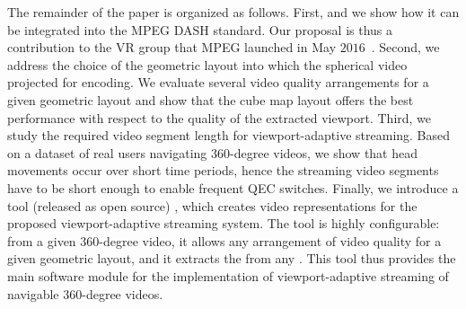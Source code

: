The remainder of the paper is organized as follows. First,  and
we show how it can be integrated into
the \ac{MPEG} \ac{DASH} standard. Our proposal is thus a contribution
to the \ac{VR} group that \ac{MPEG} launched in May
$2016$~\cite{mpeg-vr}. Second, we address the choice of the geometric
layout into which the spherical video  projected for
encoding. We evaluate several video quality arrangements for a given
geometric layout and show that the cube map layout offers the best
performance with respect to the quality of the extracted viewport.
Third, we study the required video segment length for
viewport-adaptive streaming. Based on a dataset of real users
navigating 360-degree videos, we show that head movements occur over
short time periods, hence the streaming video segments have to be
short enough to enable frequent \ac{QEC} switches. 
Finally, we introduce a tool (released as open source)%
, which creates video representations for the proposed viewport-adaptive streaming system.
The tool is highly configurable: from a given
360-degree video, it allows any arrangement of video quality for a
given geometric layout, and it extracts the  from any .
This tool thus provides the main software module
for the implementation of viewport-adaptive streaming of navigable
360-degree videos.

